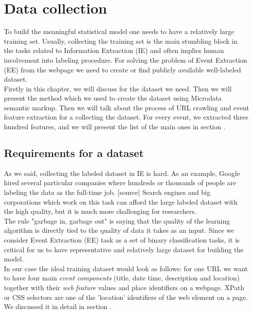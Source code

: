 \chapter{Data collection}
\label{chap:datacollect}
To build the meaningful statistical model one needs to have a relatively large training set. Usually, collecting the training set is the main stumbling block in the tasks related to Information Extraction (IE) and often implies human involvement into labeling procedure. For solving the problem of Event Extraction (EE) from the webpage we need to create or find publicly available well-labeled dataset.\\

Firstly in this chapter, we will discuss  for the dataset we need. Then we will present the method which we used to create the dataset using Microdata semantic markup. Then we will talk about the process of URL crawling and event feature extraction for a collecting the dataset. For every event, we extracted three hundred features, and we will present the list of the main ones in section .

\section{Requirements for a dataset}

As we said, collecting the labeled dataset in IE is hard. As an example, Google hired several particular companies where hundreds or thousands of people are labeling the data as the full-time job. [source] Search engines and big corporations which work on this task can afford the large labeled dataset with the high quality, but it is much more challenging for researchers. \\

The rule "garbage in, garbage out" is saying that the quality of the learning algorithm is directly tied to the quality of data it takes as an input. Since we consider Event Extraction (EE) task as a set of binary classification tasks, it is critical for us to have representative and relatively large dataset for building the model.\\

In our case the ideal training dataset would look as follows: for one URL we want to have four main \textit{event components} (title, date time, description and location) together with their \textit{web feature} values and place identifiers on a webpage. XPath or CSS selectors are one of the 'location' identifiers of the web element on a page. We discussed it in detail in section .\\

